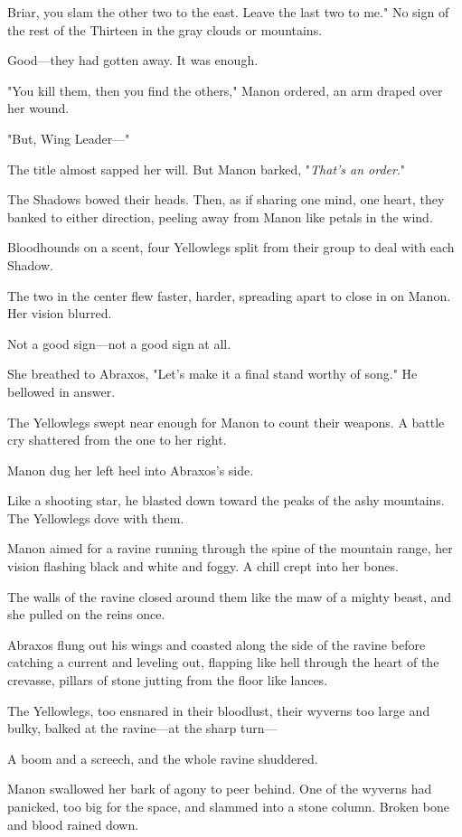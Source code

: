Briar, you slam the other two to the east. Leave the last two to me." No sign of the rest of the Thirteen in the gray clouds or mountains.

Good---they had gotten away. It was enough.

"You kill them, then you find the others," Manon ordered, an arm draped over her wound.

"But, Wing Leader---"

The title almost sapped her will. But Manon barked, "\emph{That's an order}."

The Shadows bowed their heads. Then, as if sharing one mind, one heart, they banked to either direction, peeling away from Manon like petals in the wind.

Bloodhounds on a scent, four Yellowlegs split from their group to deal with each Shadow.

The two in the center flew faster, harder, spreading apart to close in on Manon. Her vision blurred.

Not a good sign---not a good sign at all.

She breathed to Abraxos, "Let's make it a final stand worthy of song." He bellowed in answer.

The Yellowlegs swept near enough for Manon to count their weapons. A battle cry shattered from the one to her right.

Manon dug her left heel into Abraxos's side.

Like a shooting star, he blasted down toward the peaks of the ashy mountains. The Yellowlegs dove with them.

Manon aimed for a ravine running through the spine of the mountain range, her vision flashing black and white and foggy. A chill crept into her bones.

The walls of the ravine closed around them like the maw of a mighty beast, and she pulled on the reins once.

Abraxos flung out his wings and coasted along the side of the ravine before catching a current and leveling out, flapping like hell through the heart of the crevasse, pillars of stone jutting from the floor like lances.

The Yellowlegs, too ensnared in their bloodlust, their wyverns too large and bulky, balked at the ravine---at the sharp turn---

A boom and a screech, and the whole ravine shuddered.

Manon swallowed her bark of agony to peer behind. One of the wyverns had panicked, too big for the space, and slammed into a stone column. Broken bone and blood rained down.

